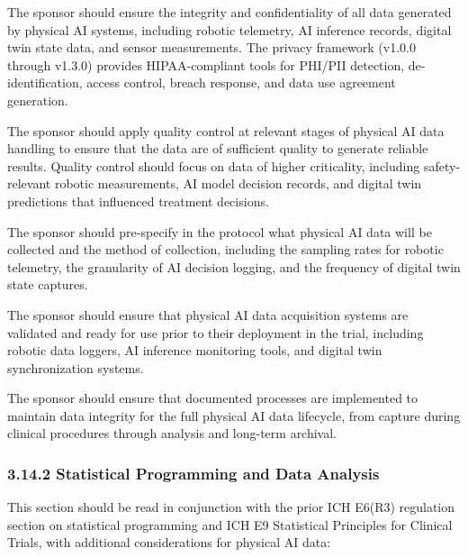 \documentclass[11pt]{article}
\begin{document}
\begin{description}[leftmargin=2.5cm,style=sameline]

\item[(a)] The sponsor should ensure the integrity and confidentiality of all data generated by physical AI systems, including robotic telemetry, AI inference records, digital twin state data, and sensor measurements. The privacy framework (v1.0.0 through v1.3.0) provides HIPAA-compliant tools for PHI/PII detection, de-identification, access control, breach response, and data use agreement generation.

\item[(b)] The sponsor should apply quality control at relevant stages of physical AI data handling to ensure that the data are of sufficient quality to generate reliable results. Quality control should focus on data of higher criticality, including safety-relevant robotic measurements, AI model decision records, and digital twin predictions that influenced treatment decisions.

\item[(c)] The sponsor should pre-specify in the protocol what physical AI data will be collected and the method of collection, including the sampling rates for robotic telemetry, the granularity of AI decision logging, and the frequency of digital twin state captures.

\item[(d)] The sponsor should ensure that physical AI data acquisition systems are validated and ready for use prior to their deployment in the trial, including robotic data loggers, AI inference monitoring tools, and digital twin synchronization systems.

\item[(e)] The sponsor should ensure that documented processes are implemented to maintain data integrity for the full physical AI data lifecycle, from capture during clinical procedures through analysis and long-term archival.

\end{description}

\subsubsection{3.14.2 Statistical Programming and Data Analysis}

This section should be read in conjunction with the prior ICH E6(R3) regulation section on statistical programming and ICH E9 Statistical Principles for Clinical Trials, with additional considerations for physical AI data:
\end{document}
